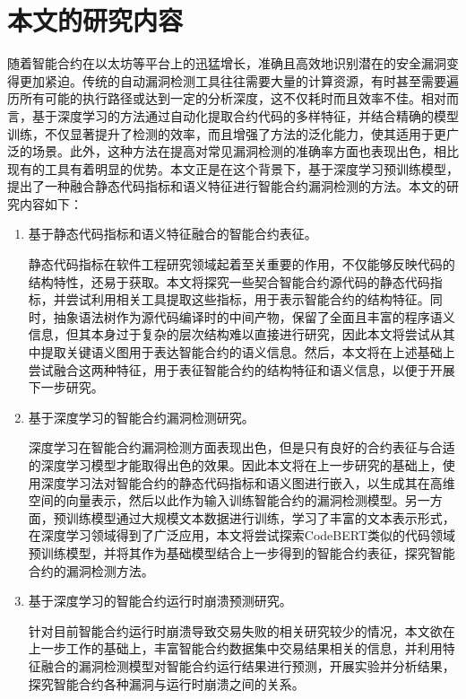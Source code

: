 \section{本文的研究内容}
\label{sec:本文的研究内容}

随着智能合约在以太坊等平台上的迅猛增长，准确且高效地识别潜在的安全漏洞变得更加紧迫。传统的自动漏洞检测工具往往需要大量的计算资源，有时甚至需要遍历所有可能的执行路径或达到一定的分析深度，这不仅耗时而且效率不佳。相对而言，基于深度学习的方法通过自动化提取合约代码的多样特征，并结合精确的模型训练，不仅显著提升了检测的效率，而且增强了方法的泛化能力，使其适用于更广泛的场景。此外，这种方法在提高对常见漏洞检测的准确率方面也表现出色，相比现有的工具有着明显的优势。本文正是在这个背景下，基于深度学习预训练模型，提出了一种融合静态代码指标和语义特征进行智能合约漏洞检测的方法。本文的研究内容如下：
\begin{enumerate}[label=(\arabic*)]
    \item 基于静态代码指标和语义特征融合的智能合约表征。
    
    静态代码指标在软件工程研究领域起着至关重要的作用，不仅能够反映代码的结构特性，还易于获取。本文将探究一些契合智能合约源代码的静态代码指标，并尝试利用相关工具提取这些指标，用于表示智能合约的结构特征。同时，抽象语法树作为源代码编译时的中间产物，保留了全面且丰富的程序语义信息，但其本身过于复杂的层次结构难以直接进行研究，因此本文将尝试从其中提取关键语义图用于表达智能合约的语义信息。然后，本文将在上述基础上尝试融合这两种特征，用于表征智能合约的结构特征和语义信息，以便于开展下一步研究。
    \item 基于深度学习的智能合约漏洞检测研究。
    
    深度学习在智能合约漏洞检测方面表现出色，但是只有良好的合约表征与合适的深度学习模型才能取得出色的效果。因此本文将在上一步研究的基础上，使用深度学习法对智能合约的静态代码指标和语义图进行嵌入，以生成其在高维空间的向量表示，然后以此作为输入训练智能合约的漏洞检测模型。另一方面，预训练模型通过大规模文本数据进行训练，学习了丰富的文本表示形式，在深度学习领域得到了广泛应用，本文将尝试探索CodeBERT类似的代码领域预训练模型，并将其作为基础模型结合上一步得到的智能合约表征，探究智能合约的漏洞检测方法。
    \item 基于深度学习的智能合约运行时崩溃预测研究。
    
    针对目前智能合约运行时崩溃导致交易失败的相关研究较少的情况，本文欲在上一步工作的基础上，丰富智能合约数据集中交易结果相关的信息，并利用特征融合的漏洞检测模型对智能合约运行结果进行预测，开展实验并分析结果，探究智能合约各种漏洞与运行时崩溃之间的关系。
    
\end{enumerate}
